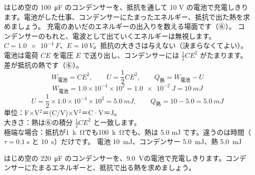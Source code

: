 \label{ph:電-9:ex5}
\begin{phreidai}[充電のエネルギーの行き先]
はじめ空の \qty{100}{\micro F} のコンデンサーを、抵抗を通して 10 V の電池で充電しきります。電池がした仕事、コンデンサーにたまったエネルギー、抵抗で出た熱を求めましょう。
\phbamen
充電のあいだのエネルギーの出入りを数える場面です（⑥）。
\phmushi
コンデンサーのもれと、電波として出ていくエネルギーは無視します。
\phzu
$C=\qty{1.0e-4}{F}$、$E=\qty{10}{V}$。抵抗の大きさは与えない（決まらなくてよい）。
\phriyu
電池は電荷 $CE$ を電圧 $E$ で送り出し、コンデンサーには $\tfrac12CE^2$ がたまります。差が抵抗の熱です（⑥）。
\phtateru
\[ W_{\text{電池}}=CE^2,\qquad U=\frac12CE^2,\qquad Q_{\text{熱}}=W_{\text{電池}}-U \]
\phtoku
\[ W_{\text{電池}}=1.0\times10^{-4}\times10^2=\qty{1.0e-2}{J}=\qty{10}{mJ} \]
\[ U=\frac12\times1.0\times10^{-4}\times10^2=\qty{5.0}{mJ},\qquad Q_{\text{熱}}=10-5.0=\qty{5.0}{mJ} \]
\phtashikame
単位：F×V$^2$＝(C/V)×V$^2$＝C·V＝J。\\
大きさ：熱は⑥の積分 $\tfrac12CE^2$ と一致します。\\
極端な場合：抵抗が\qty{1}{k\ohm}でも\qty{100}{k\ohm}でも、熱は 5.0 mJ です。違うのは時間（$\tau=\qty{0.1}{s}$ と \qty{10}{s}）だけです。
\kotae 電池 \qty{10}{mJ}、コンデンサー \qty{5.0}{mJ}、熱 \qty{5.0}{mJ}
\end{phreidai}
\begin{jibun}
はじめ空の \qty{220}{\micro F} のコンデンサーを、\qty{9.0}{V}の電池で充電しきります。コンデンサーにたまるエネルギーと、抵抗で出る熱を求めましょう。
\end{jibun}

